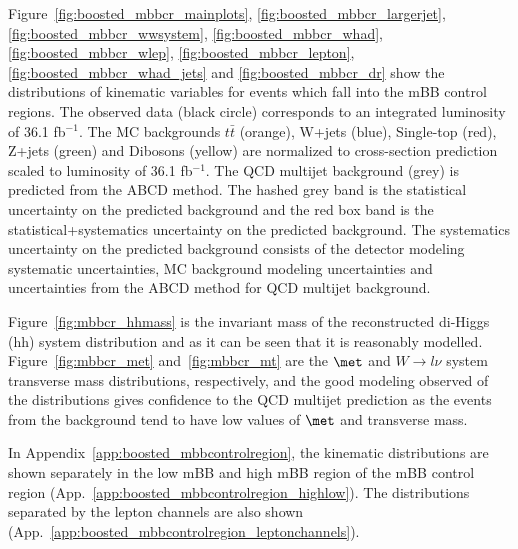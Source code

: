 Figure~\ref{fig:boosted_mbbcr_mainplots}, \ref{fig:boosted_mbbcr_largerjet}, \ref{fig:boosted_mbbcr_wwsystem},
\ref{fig:boosted_mbbcr_whad}, \ref{fig:boosted_mbbcr_wlep}, \ref{fig:boosted_mbbcr_lepton}, \ref{fig:boosted_mbbcr_whad_jets}
and \ref{fig:boosted_mbbcr_dr} show the distributions of kinematic variables for events which fall into the mBB control regions.
The observed data (black circle) corresponds to an integrated luminosity of 36.1 fb$^{-1}$. The MC backgrounds $t\bar{t}$ (orange), W+jets (blue),
Single-top (red), Z+jets (green) and Dibosons (yellow) are normalized to cross-section prediction scaled to luminosity of 36.1 fb$^{-1}$.
The QCD multijet background (grey) is predicted from the ABCD method. The hashed grey band is the statistical uncertainty on
the predicted background and the red box band is the statistical+systematics uncertainty on the predicted background.
The systematics uncertainty on the predicted background consists of the detector modeling systematic uncertainties,
MC background modeling uncertainties and uncertainties from the ABCD method for QCD multijet background.
 
Figure~\ref{fig:mbbcr_hhmass} is the invariant mass of the reconstructed di-Higgs (hh)
system distribution and as it can be seen that it is reasonably modelled. Figure~\ref{fig:mbbcr_met} and~\ref{fig:mbbcr_mt}
are the $\met$ and $W \to l\nu$ system transverse mass distributions, respectively, and the good modeling observed of the
distributions gives confidence to the QCD multijet prediction as the events from the background tend to have
low values of $\met$ and transverse mass.
 
In Appendix~\ref{app:boosted_mbbcontrolregion}, the kinematic distributions are shown separately in the low mBB and high mBB region
of the mBB control region (App.~\ref{app:boosted_mbbcontrolregion_highlow}). The distributions separated by the lepton channels are
also shown (App.~\ref{app:boosted_mbbcontrolregion_leptonchannels}).
 
